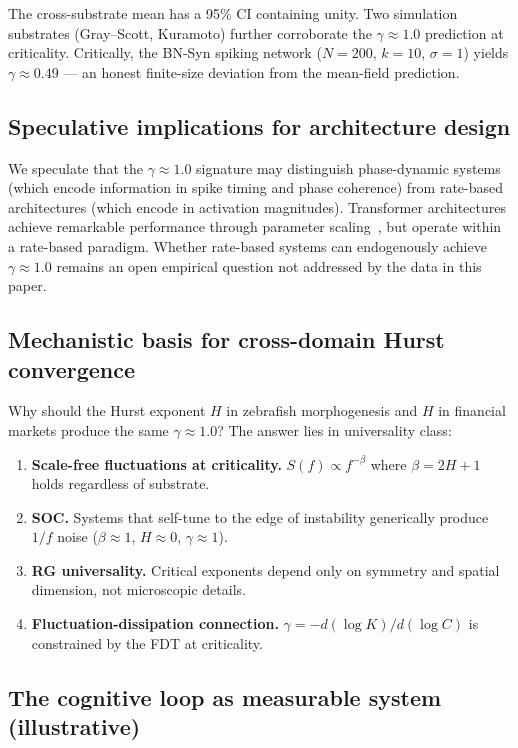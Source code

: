 \documentclass[11pt,a4paper,twocolumn]{article}
\begin{document}
The cross-substrate mean has a 95\% CI containing unity. Two simulation substrates (Gray--Scott, Kuramoto) further corroborate the $\gamma \approx 1.0$ prediction at criticality. Critically, the BN-Syn spiking network ($N\!=\!200$, $k\!=\!10$, $\sigma\!=\!1$) yields $\gamma \approx 0.49$ --- an honest finite-size deviation from the mean-field prediction.

\subsection{Speculative implications for architecture design}

We speculate that the $\gamma \approx 1.0$ signature may distinguish phase-dynamic systems (which encode information in spike timing and phase coherence) from rate-based architectures (which encode in activation magnitudes). Transformer architectures achieve remarkable performance through parameter scaling~\cite{vaswani2017}, but operate within a rate-based paradigm. Whether rate-based systems can endogenously achieve $\gamma \approx 1.0$ remains an open empirical question not addressed by the data in this paper.

\subsection{Mechanistic basis for cross-domain Hurst convergence}

Why should the Hurst exponent $H$ in zebrafish morphogenesis and $H$ in financial markets produce the same $\gamma \approx 1.0$? The answer lies in universality class:
\begin{enumerate}
\item \textbf{Scale-free fluctuations at criticality.} $S(f) \propto f^{-\beta}$ where $\beta = 2H+1$ holds regardless of substrate.
\item \textbf{SOC.} Systems that self-tune to the edge of instability generically produce $1/f$ noise ($\beta \approx 1$, $H \approx 0$, $\gamma \approx 1$).
\item \textbf{RG universality.} Critical exponents depend only on symmetry and spatial dimension, not microscopic details.
\item \textbf{Fluctuation-dissipation connection.} $\gamma = -d(\log K)/d(\log C)$ is constrained by the FDT at criticality.
\end{enumerate}

\subsection{The cognitive loop as measurable system (illustrative)}
\end{document}
